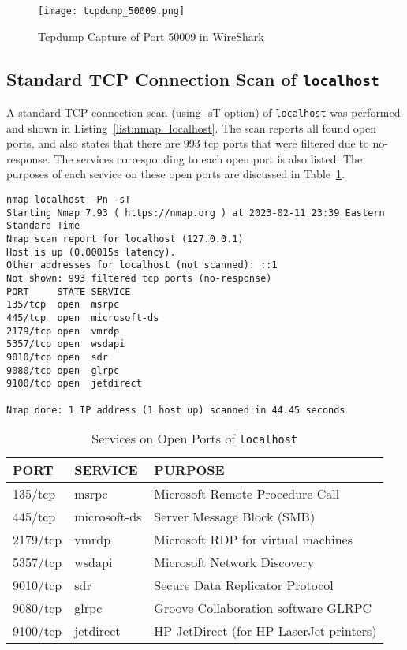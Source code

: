 \begin{figure}[htp]
\centering
\caption[tcpdump_50009]{Tcpdump Capture of Port 50009 in WireShark}\label{fig:wireshark_50009}
\texttt{[image: tcpdump\_50009.png]}
\end{figure}

\subsection*{Standard TCP Connection Scan of \texttt{localhost}}
A standard TCP connection scan (using -sT option) of \texttt{localhost} was performed and shown in Listing~\ref{list:nmap_localhost}. The scan reports all found open ports, and also states that there are 993 tcp ports that were filtered due to no-response. The services corresponding to each open port is also listed. The purposes of each service on these open ports are discussed in Table~\ref{tab:services}.

\begin{lstlisting}[caption=Nmap Standard TCP Connection Scan of \texttt{localhost},label=list:nmap_localhost]
nmap localhost -Pn -sT
Starting Nmap 7.93 ( https://nmap.org ) at 2023-02-11 23:39 Eastern Standard Time
Nmap scan report for localhost (127.0.0.1)
Host is up (0.00015s latency).
Other addresses for localhost (not scanned): ::1
Not shown: 993 filtered tcp ports (no-response)
PORT     STATE SERVICE
135/tcp  open  msrpc
445/tcp  open  microsoft-ds
2179/tcp open  vmrdp
5357/tcp open  wsdapi
9010/tcp open  sdr
9080/tcp open  glrpc
9100/tcp open  jetdirect

Nmap done: 1 IP address (1 host up) scanned in 44.45 seconds
\end{lstlisting}

\begin{table}[htp]
\centering
\caption[localhost_services]{Services on Open Ports of \texttt{localhost}}\label{tab:services}
\begin{tabular}{|l|l|l|}
\hline
PORT     & SERVICE      & PURPOSE                                   \\ \hline
135/tcp  & msrpc        & Microsoft Remote Procedure Call           \\ \hline
445/tcp  & microsoft-ds & Server Message Block (SMB)                \\ \hline
2179/tcp & vmrdp        & Microsoft RDP for virtual machines        \\ \hline
5357/tcp & wsdapi       & Microsoft Network Discovery               \\ \hline
9010/tcp & sdr          & Secure Data Replicator Protocol           \\ \hline
9080/tcp & glrpc        & Groove Collaboration software GLRPC       \\ \hline
9100/tcp & jetdirect    & HP JetDirect (for HP LaserJet printers)   \\ \hline
\end{tabular}
\end{table}

